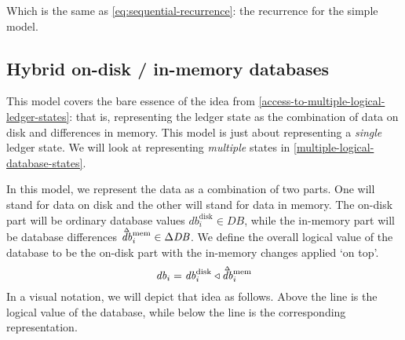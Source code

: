 \documentclass[11pt,a4paper]{article}
\newcommand\deltavar[1]{\accentset{\Delta}{#1}}
\begin{document}
Which is the same as \cref{eq:sequential-recurrence}: the recurrence for the simple model.

\subsection{Hybrid on-disk / in-memory databases}
\label{sec:hybrid-on-disk-in-memory-db}

This model covers the bare essence of the idea from
\cref{access-to-multiple-logical-ledger-states}: that is, representing the
ledger state as the combination of data on disk and differences in memory. This
model is just about representing a \emph{single} ledger state. We will look at
representing \emph{multiple} states in \cref{multiple-logical-database-states}.

In this model, we represent the data as a combination of two parts. One will
stand for data on disk and the other will stand for data in memory. The on-disk part
will be ordinary database values
$\mathit{db}^{\mathrm{disk}}_i \in \mathit{DB}$, while the in-memory part will
be database differences
$\deltavar{\mathit{db}}^{\mathrm{mem}}_i \in \Delta{\mathit{DB}}$. We
define the  overall logical value of the database to be the on-disk part with
the in-memory changes applied `on top'.
\begin{equation}
\label{eq:hybrid-db}
\mathit{db}_i = \mathit{db}^{\mathrm{disk}}_i \triangleleft \deltavar{\mathit{db}}^{\mathrm{mem}}_i
\end{equation}
In a visual notation, we will depict that idea as follows. Above the line is
the logical value of the database, while below the line is the corresponding
representation.
\begin{center}
\end{center}
\end{document}
